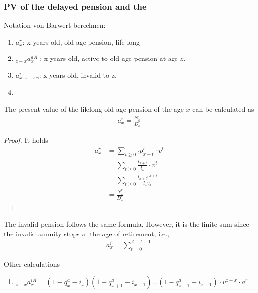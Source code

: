 \subsubsection{PV of the delayed pension and the  }
Notation von Barwert berechnen: 

\begin{enumerate}
	\item $a_x^r$: x-years old, old-age pension, life long
	\item ${}_{z - x} a_x^{a A}$ : x-years old, active to old-age pension at age $z$.   
	\item $ a_{x, z - x\neg}^i$: x-years old, invalid to z. 
	\item 
\end{enumerate}



\begin{lemma}
	The present value of the lifelong old-age pension of the age $x$ can be calculated as 
	\begin{align*}
		a_x^r=  \frac{N_x^r}{D_x^r}
	\end{align*}
\end{lemma}
\begin{proof}
It holds
\begin{align*}
	a_x^r &= \sum_{t \ge 0} {}_tp_{x + t}^r \cdot v^t \\
	& = \sum_{t \ge 0} \frac{l_{x + t}}{l_x} \cdot v^t \\
	& = \sum_{ t \ge 0} \frac{l_{x + t} v^{x + t}}{l_x v_x} \\
	& = \frac{N_x^r}{D_x^r}
\end{align*}
\end{proof}

\begin{lemma}
	The invalid pension follows the same formula. However, it is the finite sum since the invalid annuity stops at the age of retirement, i.e., 
	\begin{align*}
		a_x^i = \sum_{t = 0}^{Z - t - 1}
	\end{align*}	
\end{lemma}

\begin{lemma}
	Other calculations
	\begin{enumerate}
		\item ${}_{z - x} a_x^{iA} = ( 1- q_x^a - i_x)(1 - q_{x + 1}^a - i_{x + 1}) \dots (1 - q_{z - 1}^a - i_{z - 1}) \cdot v^{z - x} \cdot a_z^r$
	\end{enumerate}
\end{lemma}


